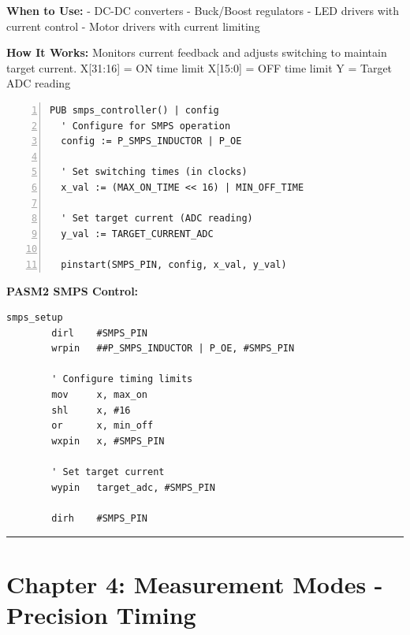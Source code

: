 \documentclass[11pt,a4paper,oneside,english]{book}
\begin{document}
\textbf{When to Use:} - DC-DC converters - Buck/Boost regulators - LED
drivers with current control - Motor drivers with current limiting

\textbf{How It Works:} Monitors current feedback and adjusts switching
to maintain target current. X{[}31:16{]} = ON time limit X{[}15:0{]} =
OFF time limit Y = Target ADC reading

\begin{Spin2Block}
\begin{Verbatim}[numbers=left,numbersep=5pt,xleftmargin=15pt]
PUB smps_controller() | config
  ' Configure for SMPS operation
  config := P_SMPS_INDUCTOR | P_OE
  
  ' Set switching times (in clocks)
  x_val := (MAX_ON_TIME << 16) | MIN_OFF_TIME
  
  ' Set target current (ADC reading)
  y_val := TARGET_CURRENT_ADC
  
  pinstart(SMPS_PIN, config, x_val, y_val)
\end{Verbatim}
\end{Spin2Block}

\textbf{PASM2 SMPS Control:}

\begin{PASM2Block}
\begin{lstlisting}
smps_setup
        dirl    #SMPS_PIN
        wrpin   ##P_SMPS_INDUCTOR | P_OE, #SMPS_PIN
        
        ' Configure timing limits
        mov     x, max_on
        shl     x, #16
        or      x, min_off
        wxpin   x, #SMPS_PIN
        
        ' Set target current
        wypin   target_adc, #SMPS_PIN
        
        dirh    #SMPS_PIN
\end{lstlisting}
\end{PASM2Block}

\begin{center}\rule{0.5\linewidth}{0.5pt}\end{center}

\clearpage

\clearpage

\hypertarget{chapter-4-measurement-modes---precision-timing}{%
\chapter{Chapter 4: Measurement Modes - Precision
Timing}\label{chapter-4-measurement-modes---precision-timing}}
\end{document}

